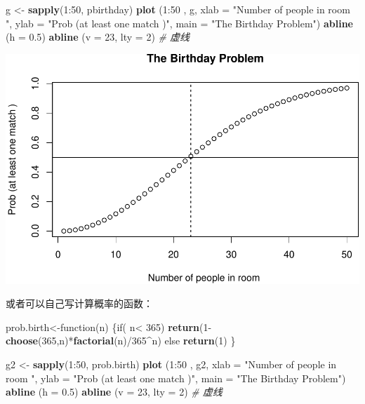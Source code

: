 \documentclass[]{article}
\newenvironment{Shaded}{\begin{snugshade}}{\end{snugshade}}
\newcommand{\KeywordTok}[1]{\textcolor[rgb]{0.13,0.29,0.53}{\textbf{{#1}}}}
\newcommand{\DataTypeTok}[1]{\textcolor[rgb]{0.13,0.29,0.53}{{#1}}}
\newcommand{\DecValTok}[1]{\textcolor[rgb]{0.00,0.00,0.81}{{#1}}}
\newcommand{\FloatTok}[1]{\textcolor[rgb]{0.00,0.00,0.81}{{#1}}}
\newcommand{\StringTok}[1]{\textcolor[rgb]{0.31,0.60,0.02}{{#1}}}
\newcommand{\CommentTok}[1]{\textcolor[rgb]{0.56,0.35,0.01}{\textit{{#1}}}}
\newcommand{\NormalTok}[1]{{#1}}
\begin{document}
\begin{Shaded}
\begin{Highlighting}[]
\NormalTok{g <-}\StringTok{ }\KeywordTok{sapply}\NormalTok{(}\DecValTok{1}\NormalTok{:}\DecValTok{50}\NormalTok{, pbirthday)}
\KeywordTok{plot} \NormalTok{(}\DecValTok{1}\NormalTok{:}\DecValTok{50} \NormalTok{, g,}
      \DataTypeTok{xlab =} \StringTok{"Number of people in room "}\NormalTok{,}
      \DataTypeTok{ylab =} \StringTok{"Prob (at least one match )"}\NormalTok{,}
      \DataTypeTok{main =} \StringTok{"The Birthday Problem"}\NormalTok{)}
\KeywordTok{abline} \NormalTok{(}\DataTypeTok{h =} \FloatTok{0.5}\NormalTok{)}
\KeywordTok{abline} \NormalTok{(}\DataTypeTok{v =} \DecValTok{23}\NormalTok{, }\DataTypeTok{lty =} \DecValTok{2}\NormalTok{) }\CommentTok{# 虚线}
\end{Highlighting}
\end{Shaded}

\includegraphics{probability_files/figure-latex/unnamed-chunk-6-1.pdf}

或者可以自己写计算概率的函数：

\begin{Shaded}
\begin{Highlighting}[]
\NormalTok{prob.birth<-function(n)}
  \NormalTok{\{if( n<}\StringTok{ }\DecValTok{365}\NormalTok{) }
    \KeywordTok{return}\NormalTok{(}\DecValTok{1}\NormalTok{-}\KeywordTok{choose}\NormalTok{(}\DecValTok{365}\NormalTok{,n)*}\KeywordTok{factorial}\NormalTok{(n)/}\DecValTok{365}\NormalTok{^n)}
  \NormalTok{else}
    \KeywordTok{return}\NormalTok{(}\DecValTok{1}\NormalTok{)}
  \NormalTok{\}}

\NormalTok{g2 <-}\StringTok{ }\KeywordTok{sapply}\NormalTok{(}\DecValTok{1}\NormalTok{:}\DecValTok{50}\NormalTok{, prob.birth)}
\KeywordTok{plot} \NormalTok{(}\DecValTok{1}\NormalTok{:}\DecValTok{50} \NormalTok{, g2,}
      \DataTypeTok{xlab =} \StringTok{"Number of people in room "}\NormalTok{,}
      \DataTypeTok{ylab =} \StringTok{"Prob (at least one match )"}\NormalTok{,}
      \DataTypeTok{main =} \StringTok{"The Birthday Problem"}\NormalTok{)}
\KeywordTok{abline} \NormalTok{(}\DataTypeTok{h =} \FloatTok{0.5}\NormalTok{)}
\KeywordTok{abline} \NormalTok{(}\DataTypeTok{v =} \DecValTok{23}\NormalTok{, }\DataTypeTok{lty =} \DecValTok{2}\NormalTok{) }\CommentTok{# 虚线}
\end{Highlighting}
\end{Shaded}
\end{document}
